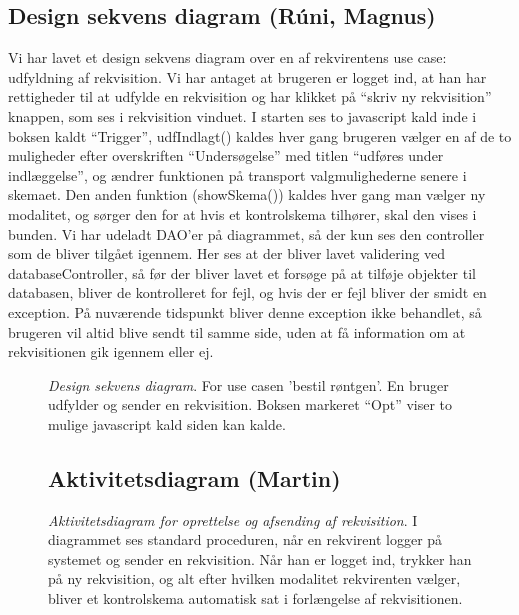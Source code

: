 \subsection*{Design sekvens diagram (Rúni, Magnus)}
Vi har lavet et design sekvens diagram over en af rekvirentens use case:
udfyldning af rekvisition. Vi har antaget at brugeren er logget ind, at han har
rettigheder til at udfylde en rekvisition og har klikket på “skriv ny
rekvisition” knappen, som ses i rekvisition vinduet. I starten ses to javascript
kald inde i boksen kaldt “Trigger”, udfIndlagt() kaldes hver gang brugeren
vælger en af de to muligheder efter overskriften “Undersøgelse” med titlen
“udføres under indlæggelse”,  og ændrer funktionen på transport valgmulighederne
senere i skemaet. Den anden funktion (showSkema()) kaldes hver gang man vælger
ny modalitet, og sørger den for at hvis et kontrolskema tilhører, skal den vises
i bunden. Vi har udeladt DAO’er på diagrammet, så der kun ses den controller som
de bliver tilgået igennem. Her ses at der bliver lavet validering ved
databaseController, så før der bliver lavet et forsøge på at tilføje objekter
til databasen, bliver de kontrolleret for fejl, og hvis der er fejl bliver der
smidt en exception. På nuværende tidspunkt bliver denne exception ikke
behandlet, så brugeren vil altid blive sendt til samme side, uden at få
information om at rekvisitionen gik igennem eller ej.
\FloatBarrier
\begin{figure}[h]
\centering
{}
\caption{\emph{Design sekvens diagram}. For use casen 'bestil røntgen'. En
bruger udfylder og sender en rekvisition. Boksen markeret “Opt” viser to mulige
javascript kald siden kan kalde. \label{dsd}}
\end{figure}
\FloatBarrier
\begin{figure}[h]
\subsection*{Aktivitetsdiagram (Martin)}
\centering
{}
\caption{\emph{Aktivitetsdiagram for oprettelse og afsending af rekvisition}. I
diagrammet ses standard proceduren, når en rekvirent logger på systemet
og sender en rekvisition. Når han er logget ind, trykker han på ny rekvisition,
og alt efter hvilken modalitet rekvirenten vælger, bliver et kontrolskema
automatisk sat i forlængelse af rekvisitionen. \label{aktivitetsdiagram}}
\end{figure}

